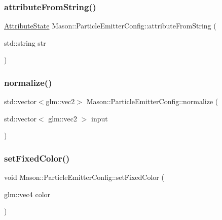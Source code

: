 \subsubsection{\texorpdfstring{attribute\+From\+String()}{attributeFromString()}}
{\footnotesize\ttfamily \hyperlink{namespace_mason_aefc2ce7d9295b57af46ab6c8ebfc32f7}{Attribute\+State} Mason\+::\+Particle\+Emitter\+Config\+::attribute\+From\+String (\begin{DoxyParamCaption}\item[{std\+::string}]{str }\end{DoxyParamCaption})\hspace{0.3cm}{\ttfamily [inline]}}

\hypertarget{struct_mason_1_1_particle_emitter_config_ae3781dff36d32c1fb79a8ff63baf2c55}{}\label{struct_mason_1_1_particle_emitter_config_ae3781dff36d32c1fb79a8ff63baf2c55} 
\subsubsection{\texorpdfstring{normalize()}{normalize()}}
{\footnotesize\ttfamily std\+::vector$<$glm\+::vec2$>$ Mason\+::\+Particle\+Emitter\+Config\+::normalize (\begin{DoxyParamCaption}\item[{std\+::vector$<$ glm\+::vec2 $>$}]{input }\end{DoxyParamCaption})\hspace{0.3cm}{\ttfamily [inline]}}

\hypertarget{struct_mason_1_1_particle_emitter_config_ae4aa09d5feb556808fba6c23167d9d78}{}\label{struct_mason_1_1_particle_emitter_config_ae4aa09d5feb556808fba6c23167d9d78} 
\subsubsection{\texorpdfstring{set\+Fixed\+Color()}{setFixedColor()}}
{\footnotesize\ttfamily void Mason\+::\+Particle\+Emitter\+Config\+::set\+Fixed\+Color (\begin{DoxyParamCaption}\item[{glm\+::vec4}]{color }\end{DoxyParamCaption})\hspace{0.3cm}{\ttfamily [inline]}}


